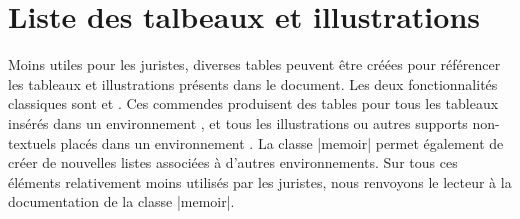\section{Liste des talbeaux et illustrations}

Moins utiles pour les juristes, diverses tables peuvent être créées pour référencer les tableaux et illustrations présents dans le document. Les deux fonctionnalités classiques sont  et . Ces commendes produisent des tables pour tous les tableaux insérés dans un environnement , et tous les illustrations ou autres supports non-textuels placés dans un environnement . La classe |memoir| permet également de créer de nouvelles listes associées à d'autres environnements. Sur tous ces éléments relativement moins utilisés par les juristes, nous renvoyons le lecteur à la documentation de la classe |memoir|.

